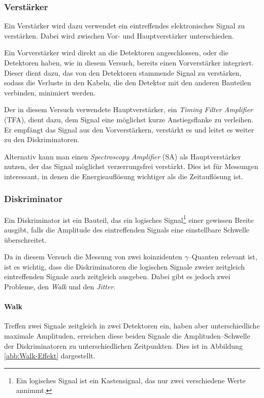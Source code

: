 \documentclass[12pt,a4paper]{scrartcl}
\numberwithin{equation}{section} %
\begin{document}
\hypertarget{verstuxe4rker}{%
\subsubsection{Verstärker}\label{verstuxe4rker}}

Ein Verstärker wird dazu verwendet ein eintreffendes elektronisches Signal zu verstärken. Dabei wird zwischen Vor- und Hauptverstärker unterschieden.

Ein Vorverstärker wird direkt an die Detektoren angeschlossen, oder die Detektoren haben, wie in diesem Versuch, bereits einen Vorverstärker integriert. Dieser dient dazu, das von den Detektoren stammende Signal
zu verstärken, sodass die Verluste in den Kabeln, die den Detektor mit den anderen Bauteilen verbinden, minimiert werden.

Der in diesem Versuch verwendete Hauptverstärker, ein \emph{Timing Filter Amplifier} (TFA), dient dazu, dem Signal eine möglichst kurze Anstiegsflanke zu verleihen. Er empfängt das Signal aus den Vorverstärkern, verstärkt es und leitet es weiter zu den Diskriminatoren.

Alternativ kann man einen \emph{Spectroscopy Amplifier} (SA) als Hauptverstärker nutzen, der das Signal möglichst verzerrungsfrei verstärkt. Dies ist für Messungen interessant, in denen die Energieauflösung wichtiger als die Zeitauflösung ist.

\hypertarget{diskriminator}{%
\subsubsection{Diskriminator}\label{diskriminator}}

Ein Diskriminator ist ein Bauteil, das ein logisches Signal\footnote{Ein logisches Signal ist ein Kastensignal, das nur zwei verschiedene Werte annimmt.} einer gewissen Breite ausgibt, falls die Amplitude des eintreffenden Signals eine einstellbare Schwelle überschreitet.

Da in diesem Versuch die Messung von zwei koinzidenten $\gamma$--Quanten relevant ist, ist es wichtig, dass die Diskriminatoren die logischen Signale zweier zeitgleich eintreffenden Signale auch zeitgleich ausgeben. Dabei gibt es jedoch zwei Probleme, den \emph{Walk} und den \emph{Jitter}.

\paragraph{Walk}
Treffen zwei Signale zeitgleich in zwei Detektoren ein, haben aber unterschiedliche maximale Amplituden, erreichen diese beiden Signale die Amplituden--Schwelle der Diskriminatoren zu unterschiedlichen Zeitpunkten. Dies ist in Abbildung \ref{abb:Walk-Effekt} dargestellt.
\end{document}
